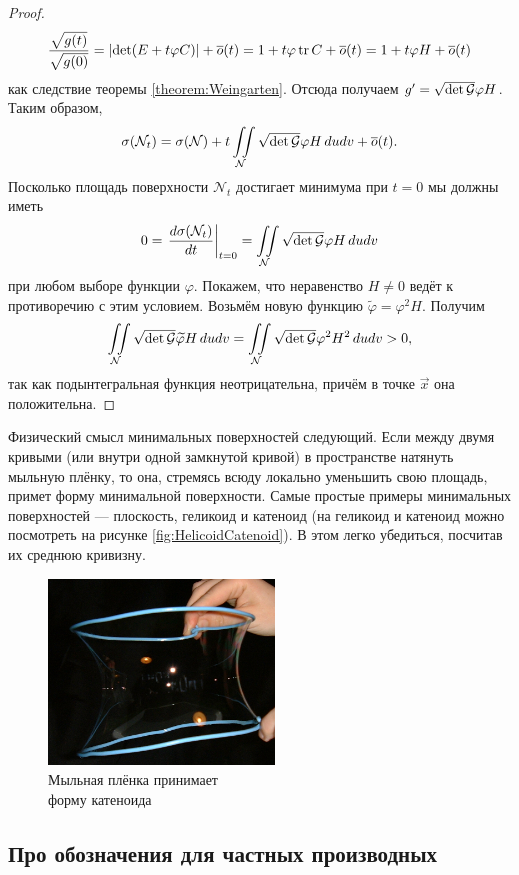 \begin{proof}
	\[
		\frac{\sqrt{g(t)}}{\sqrt{g(0)}} = \left\lvert\det(E + t\varphi C)\right\rvert + \overline{o}(t) = 1 + t\varphi\operatorname{tr} C + \overline{o}(t) = 1 + t\varphi H + \overline{o}(t)
	\]
	как следствие теоремы \ref{theorem:Weingarten}. Отсюда получаем $g^\prime = \sqrt{\det \mathcal{G}}\varphi H$. Таким образом,
	\[
		\sigma(\mathcal{N}_t) = \sigma(\mathcal{N}) + t\iint\limits_{\mathcal{N}}\sqrt{\det \mathcal{G}}\varphi H\,dudv + \overline{o}(t).
	\]
	Посколько площадь поверхности $\mathcal{N}_t$ достигает минимума при $t = 0$ мы должны иметь
	\[
		0 = \left.\frac{d\sigma(\mathcal{N}_t)}{dt}\right|_{t = 0} = \iint\limits_{\mathcal{N}}\sqrt{\det \mathcal{G}}\varphi H\,dudv
	\]
	при любом выборе функции $\varphi$. Покажем, что неравенство $H \ne 0$ ведёт к противоречию с этим условием. Возьмём новую функцию $\widetilde{\varphi} = \varphi^2H$. Получим
	\[
		\iint\limits_{\mathcal{N}}\sqrt{\det \mathcal{G}}\widetilde{\varphi}H\,dudv = \iint\limits_{\mathcal{N}}\sqrt{\det\mathcal{G}}\varphi^2H^2\,dudv > 0,
	\]
	так как подынтегральная функция неотрицательна, причём в точке $\vec{x}$ она положительна.
\end{proof}

Физический смысл минимальных поверхностей следующий. Если между двумя кривыми (или внутри одной замкнутой кривой) в пространстве натянуть мыльную плёнку, то она, стремясь всюду локально уменьшить свою площадь, примет форму минимальной поверхности. Самые простые примеры минимальных поверхностей --- плоскость, геликоид и катеноид (на геликоид и катеноид можно посмотреть на рисунке \ref{fig:HelicoidCatenoid}). В этом легко убедиться, посчитав их среднюю кривизну.

\begin{figure}[H]
	\centering
	\includegraphics[width=6cm]{./img/Membrane.png}
	\caption{Мыльная плёнка принимает\\ форму катеноида}
\end{figure}


\subsection{Про обозначения для частных производных}

